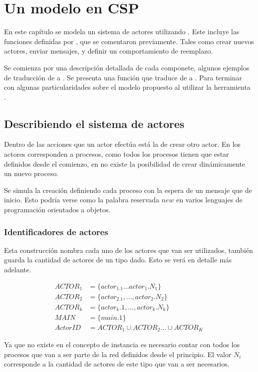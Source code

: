 \chapter{Un modelo en CSP}
En este capítulo se modela un sistema de actores utilizando \CSP. Este incluye las funciones definidas por \SAL, que se comentaron previamente. Tales como crear nuevos actores, enviar mensajes, y definir un comportamiento de reemplazo. 

Se comienza por una descripción detallada de cada componete, algunos ejemplos de traducción de \SAL a \CSP. Se presenta una función que traduce de \SAL a \CSP. Para terminar con algunas particularidades sobre el modelo propuesto al utilizar la herramienta \FDR.

\section{Describiendo el sistema de actores} 
Dentro de las acciones que un actor efectúa está la de crear otro actor. En \CSP los actores corresponden a procesos, como todos los procesos tienen que estar definidos desde el comienzo, en \CSP no existe la posibilidad de crear dinámicamente un nuevo proceso.

Se simula la creación definiendo cada proceso con la espera de un mensaje que de inicio. Esto podría verse como la palabra reservada $new$ en varios lenguajes de programación orientados a objetos. 

\subsection{Identificadores de actores}\label{model:id}
Esta construcción nombra cada uno de los actores que van ser utilizados, también guarda la cantidad de actores de un tipo dado. Esto se verá en detalle más adelante.

\begin{align*}
  ACTOR_1 &= \{actor_1.1 \ldots actor_1.N_1\} \\
  ACTOR_2 &= \{actor_2.1, \ldots ,actor_2.N_2\} \\
  ACTOR_k &= \{actor_k.1, \ldots, actor_k.N_k\} \\
  MAIN &= \{main.1\} \\
  ActorID &= ACTOR_1 \cup ACTOR_2 \ldots \cup ACTOR_K
\end{align*}

Ya que no existe en \CSP el concepto de instancia es necesario contar con todos los procesos que van a ser parte de la red definidos desde el principio. El valor $N_i$ corresponde a la cantidad de actores de este tipo que van a ser necesarios. 


